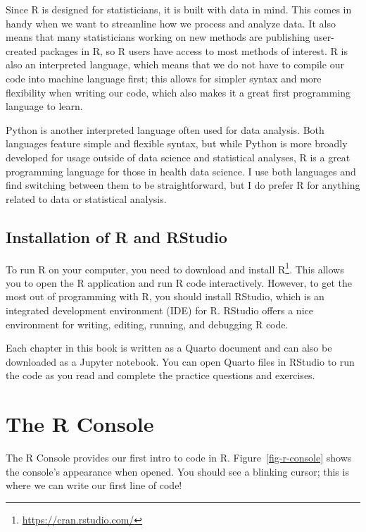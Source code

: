\documentclass[
  letterpaper,
]{latex/krantz}
\renewcommand{\href}[2]{#2\footnote{\url{#1}}}
\begin{document}
Since R is designed for statisticians, it is built with data in mind.
This comes in handy when we want to streamline how we process and
analyze data. It also means that many statisticians working on new
methods are publishing user-created packages in R, so R users have
access to most methods of interest. R is also an interpreted language,
which means that we do not have to compile our code into machine
language first; this allows for simpler syntax and more flexibility when
writing our code, which also makes it a great first programming language
to learn.

Python is another interpreted language often used for data analysis.
Both languages feature simple and flexible syntax, but while Python is
more broadly developed for usage outside of data science and statistical
analyses, R is a great programming language for those in health data
science. I use both languages and find switching between them to be
straightforward, but I do prefer R for anything related to data or
statistical analysis.

\subsection{Installation of R and
RStudio}\label{installation-of-r-and-rstudio}

To run R on your computer, you need to download and install
\href{https://cran.rstudio.com/}{R}. This allows you to open the R
application and run R code interactively. However, to get the most out
of programming with R, you should install RStudio, which is an
integrated development environment (IDE) for R. RStudio offers a nice
environment for writing, editing, running, and debugging R code.

Each chapter in this book is written as a Quarto document and can also
be downloaded as a Jupyter notebook. You can open Quarto files in
RStudio to run the code as you read and complete the practice questions
and exercises.

\section{The R Console}\label{the-r-console}

The R Console  provides our first intro to code in R.
Figure~\ref{fig-r-console} shows the console's appearance when opened.
You should see a blinking cursor; this is where we can write our first
line of code!
\end{document}
